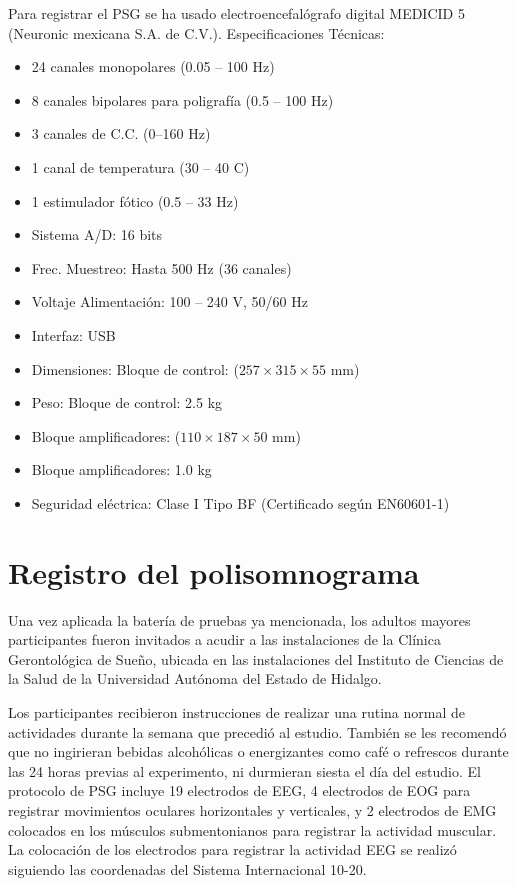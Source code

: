 \documentclass[12pt,a4paper]{mitthesis}
\begin{document}
Para registrar el PSG se ha usado electroencefal\'ografo digital MEDICID 5 (Neuronic mexicana S.A. 
de C.V.). Especificaciones T\'ecnicas:
\begin{itemize}
\item 24 canales monopolares (0.05 -- 100 Hz)
\item 8 canales bipolares para poligraf\'ia (0.5 -- 100 Hz)
\item 3 canales de C.C. (0--160 Hz)
\item 1 canal de temperatura (30 -- 40 C)
\item 1 estimulador f\'otico (0.5 -- 33 Hz)
\item Sistema A/D: 16 bits
\item Frec. Muestreo: Hasta 500 Hz (36 canales)
\item Voltaje Alimentaci\'on: 100 -- 240 V, 50/60 Hz
\item Interfaz: USB
\item Dimensiones: Bloque de control: ($257 \times 315 \times 55$ mm)
\item Peso: Bloque de control: 2.5 kg
\item Bloque amplificadores: ($110\times 187\times 50$ mm)
\item Bloque amplificadores: 1.0 kg
\item Seguridad el\'ectrica: Clase I Tipo BF (Certificado según EN60601-1)
\end{itemize}


\section{Registro del polisomnograma}

Una vez aplicada la bater\'ia de pruebas ya mencionada, los adultos mayores participantes fueron 
invitados a acudir a las instalaciones de la Cl\'inica Gerontol\'ogica de Sue\~no, ubicada en las 
instalaciones del Instituto de Ciencias de la Salud de la Universidad Aut\'onoma del Estado de 
Hidalgo.

Los participantes recibieron instrucciones de realizar una rutina normal de actividades durante la 
semana que precedi\'o al estudio. Tambi\'en se les recomend\'o que no ingirieran bebidas 
alcoh\'olicas o energizantes como caf\'e o refrescos durante las 24 horas previas al experimento, 
ni durmieran siesta el d\'ia del estudio. 
El protocolo de PSG incluye 19 electrodos de EEG, 4 electrodos de EOG para registrar movimientos 
oculares horizontales y verticales, y 2 electrodos de EMG colocados en los m\'usculos 
submentonianos para registrar la actividad muscular. 
La colocaci\'on de los electrodos para registrar la actividad EEG se realiz\'o siguiendo las 
coordenadas del Sistema Internacional 10-20\cite{Coleman87}.
\end{document}
